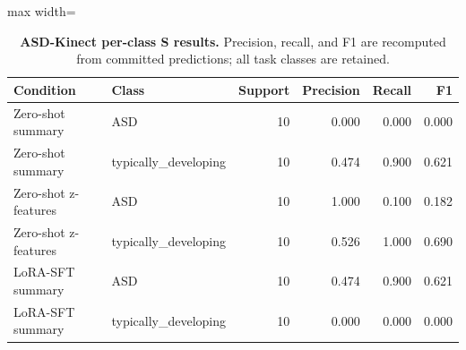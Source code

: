 \begin{table}[H]
\centering
\caption{\textbf{ASD-Kinect per-class S results.} Precision, recall, and F1 are recomputed from committed predictions; all task classes are retained.}
\label{tab:per_class_asd_kinect}
\small
\begin{adjustbox}{max width=\textwidth}
\begin{tabular}{llrrrr}
\toprule
Condition & Class & Support & Precision & Recall & F1 \\
\midrule
Zero-shot summary & ASD & 10 & 0.000 & 0.000 & 0.000 \\
Zero-shot summary & typically\_developing & 10 & 0.474 & 0.900 & 0.621 \\
Zero-shot z-features & ASD & 10 & 1.000 & 0.100 & 0.182 \\
Zero-shot z-features & typically\_developing & 10 & 0.526 & 1.000 & 0.690 \\
LoRA-SFT summary & ASD & 10 & 0.474 & 0.900 & 0.621 \\
LoRA-SFT summary & typically\_developing & 10 & 0.000 & 0.000 & 0.000 \\
\bottomrule
\end{tabular}
\end{adjustbox}
\end{table}
